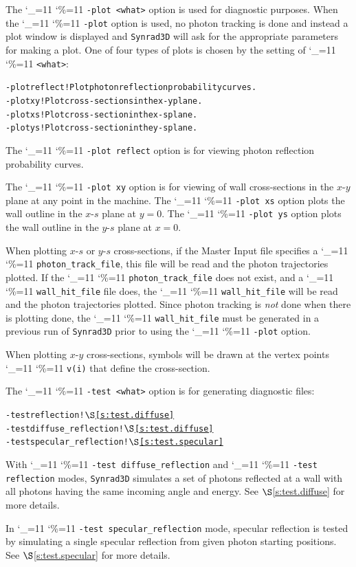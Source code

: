 \documentclass[11pt,openany]{report}
\newcommand{\sref}[1]{$\S$\ref{#1}}
\newcommand{\srthree}{\texttt{Synrad3D}\xspace}
\newcommand\ttcmd{\begingroup\catcode`\_=11 \catcode`\%=11 \dottcmd}
\newcommand\dottcmd[1]{\texttt{#1}\endgroup}
\newcommand{\vn}{\ttcmd}
\newlength{\ExBeg}
\newlength{\ExEnd}
\newenvironment{example}
  {\vspace{\ExBeg} \begin{alltt}}
  {\end{alltt} \vspace{\ExEnd}}
\begin{document}
The \vn{-plot <what>} option is used for diagnostic purposes. When the
\vn{-plot} option is used, no photon tracking is done and instead a
plot window is displayed and \srthree will ask for the appropriate
parameters for making a plot. One of four types of plots is chosen by
the setting of \vn{<what>}:
\begin{example}
  -plot reflect ! Plot photon reflection probability curves.
  -plot xy      ! Plot cross-sections in the x-y plane.
  -plot xs      ! Plot cross-section in the x-s plane.
  -plot ys      ! Plot cross-section in the y-s plane.
\end{example}

The \vn{-plot reflect} option is for viewing photon reflection
probability curves. 

The \vn{-plot xy} option is for viewing of wall
cross-sections in the $x$-$y$ plane at any point in the machine. The
\vn{-plot xs} option plots the wall outline in the $x$-$s$ plane at $y
= 0$. The \vn{-plot ys} option plots the wall outline in the $y$-$s$
plane at $x = 0$. 

When plotting $x$-$s$ or $y$-$s$ cross-sections, if the Master Input file specifies a
\vn{photon_track_file}, this file will be read and the photon trajectories plotted.  If
the \vn{photon_track_file} does not exist, and a \vn{wall_hit_file} file does, the
\vn{wall_hit_file} will be read and the photon trajectories plotted. Since photon tracking
is {\em not} done when there is plotting done, the \vn{wall_hit_file} must be generated in
a previous run of \srthree prior to using the \vn{-plot} option.

When plotting $x$-$y$ cross-sections, symbols
will be drawn at the vertex points \vn{v(i)} that define the
cross-section.

The \vn{-test <what>} option is for generating diagnostic
files:
\begin{example}
  -test reflection             ! \sref{s:test.diffuse}
  -test diffuse_reflection     ! \sref{s:test.diffuse}
  -test specular_reflection    ! \sref{s:test.specular}
\end{example}

With \vn{-test diffuse_reflection} and \vn{-test reflection} modes, \srthree simulates a set of
photons reflected at a wall with all photons having the same incoming angle and energy. See
\sref{s:test.diffuse} for more details.

In \vn{-test specular_reflection} mode, specular reflection is tested by simulating a single
specular reflection from given photon starting positions. See \sref{s:test.specular} for more
details.
\end{document}

